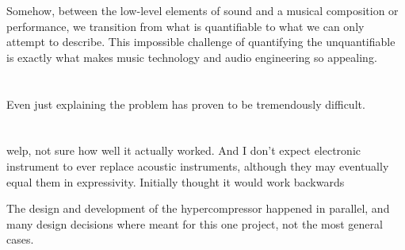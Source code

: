 Somehow, between the low-level elements of sound and a musical
composition or performance, we transition from what is quantifiable to
what we can only attempt to describe. This impossible challenge of
quantifying the unquantifiable is exactly what makes music technology
and audio engineering so appealing.



\section{}

\section{\polytempic}
Even just explaining the problem has proven to be tremendously
difficult. 

\section{\thesis}
welp, not sure how well it actually
worked. And I don't expect electronic instrument to ever replace
acoustic instruments, although they may eventually equal them in
expressivity. Initially thought it would work backwards

The design and development of the hypercompressor happened in
parallel, and many design decisions where meant for this one project,
not the most general cases. 
